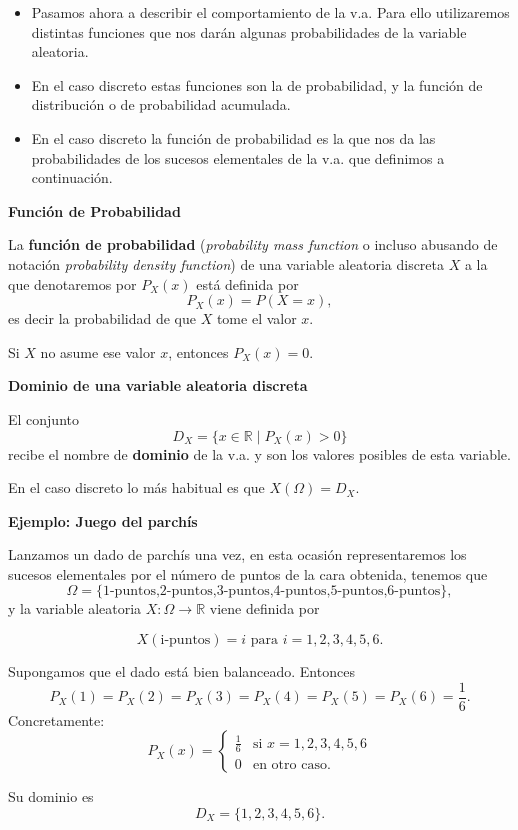 \documentclass[]{book}
\providecommand{\tightlist}{%
  \setlength{\itemsep}{0pt}\setlength{\parskip}{0pt}}
\begin{document}
\begin{itemize}
\tightlist
\item
  Pasamos ahora a describir el comportamiento de la v.a.
  Para ello utilizaremos distintas funciones que nos darán algunas probabilidades de la variable aleatoria.
\item
  En el caso discreto estas funciones son la de probabilidad, y la función de distribución o de probabilidad acumulada.
\item
  En el caso discreto la función de probabilidad es la que nos da las probabilidades de los sucesos elementales de la v.a. que definimos a continuación.
\end{itemize}

\textbf{Función de Probabilidad}

La \textbf{función de probabilidad} (\emph{probability mass function} o incluso abusando de notación \emph{probability density function}) de una variable aleatoria discreta \(X\) a la que denotaremos por \(P_{X}(x)\) está definida por
\[P_{X}(x)=P(X=x),\]
es decir la probabilidad de que \(X\) tome el valor \(x\).

Si \(X\) no asume ese valor \(x\), entonces \(P_{X}(x)=0\).

\textbf{Dominio de una variable aleatoria discreta}

El conjunto \[D_X=\{ x\in\mathbb{R} \mid P_X(x)>0\}\] recibe el nombre de
\textbf{dominio} de la v.a. y son los valores posibles de esta variable.

En el caso discreto lo más habitual es que \(X(\Omega)=D_X\).

\textbf{Ejemplo: Juego del parchís}

Lanzamos un dado de parchís una vez, en esta ocasión representaremos los
sucesos elementales por el número de puntos de la cara obtenida, tenemos que
\[\Omega=\{\mbox{1-puntos,2-puntos,3-puntos,4-puntos,5-puntos,6-puntos}\},\]
y la variable aleatoria \(X:\Omega\to \mathbb{R}\) viene definida por

\[X(\mbox{i-puntos})=i\mbox{ para } i=1,2,3,4,5,6.\]

Supongamos que el dado está bien balanceado. Entonces
\[P_{X}(1)=P_{X}(2)=P_{X}(3)=P_{X}(4)=P_{X}(5)=P_{X}(6)=\frac16.\]
Concretamente:
\[
P_{X}(x)=
  \left\{
  \begin{array}{ll}
   \frac16 & \mbox{si } x=1,2,3,4,5,6\\
  0 & \mbox{en otro caso. }
  \end{array}
  \right.
\]

Su dominio es \[D_X=\{1,2,3,4,5,6\}.\]
\end{document}
